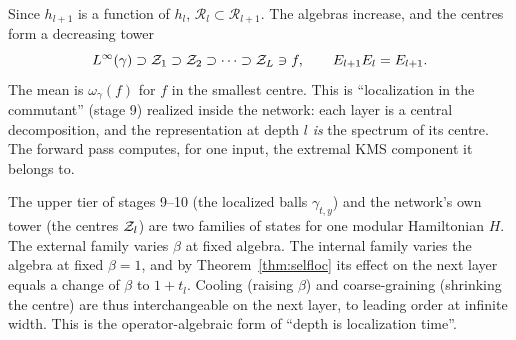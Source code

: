 Since $h_{l+1}$ is a function of $h_l$, $\mathcal R_l\subset\mathcal R_{l+1}$. The algebras increase, and the centres form a decreasing tower
\[
L^\infty(\gamma)\supset\mathcal Z_1\supset\mathcal Z_2\supset\cdots\supset\mathcal Z_L\ni f,\qquad E_{l+1}E_l=E_{l+1}.
\]
The mean is $\omega_\gamma(f)$ for $f$ in the smallest centre. This is ``localization in the commutant'' (stage 9) realized inside the
network: each layer is a central decomposition, and the representation at depth $l$ \emph{is} the spectrum of its centre. The forward
pass computes, for one input, the extremal KMS component it belongs to.

\begin{remark}
The upper tier of stages 9--10 (the localized balls $\gamma_{t,y}$) and the network's own tower (the centres $\mathcal Z_l$) are two families of
states for one modular Hamiltonian $H$. The external family varies $\beta$ at fixed algebra. The internal family varies the algebra at
fixed $\beta=1$, and by Theorem~\ref{thm:selfloc} its effect on the next layer equals a change of $\beta$ to $1+t_l$. Cooling (raising
$\beta$) and coarse-graining (shrinking the centre) are thus interchangeable on the next layer, to leading order at infinite width. This
is the operator-algebraic form of ``depth is localization time''.
\end{remark}

